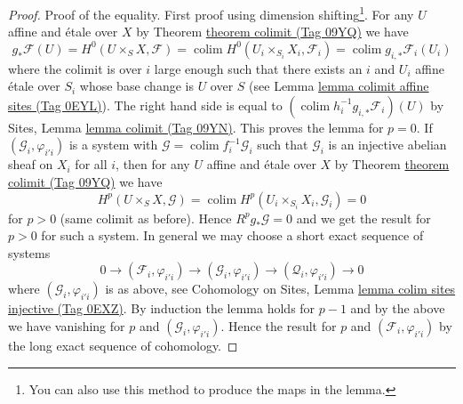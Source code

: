\documentclass{amsart}
\theoremstyle{plain}
\theoremstyle{definition}
\theoremstyle{remark}
\numberwithin{equation}{subsection}
\def\colim{\mathop{\mathrm{colim}}\nolimits}
\begin{document}
\begin{proof}
\medskip\noindent
Proof of the equality. First proof using
dimension shifting\footnote{You can also use this method
to produce the maps in the lemma.}. For any
$U$ affine and \'etale over $X$ by Theorem \href{https://stacks.math.columbia.edu/tag/09YQ}{theorem colimit (Tag 09YQ)}
we have
$$
g_*\mathcal{F}(U) =
H^0(U \times_S X, \mathcal{F}) =
\colim H^0(U_i \times_{S_i} X_i, \mathcal{F}_i) =
\colim g_{i, *}\mathcal{F}_i(U_i)
$$
where the colimit is over $i$ large enough such that
there exists an $i$ and $U_i$ affine \'etale over $S_i$
whose base change is $U$ over $S$ (see
Lemma \href{https://stacks.math.columbia.edu/tag/0EYL}{lemma colimit affine sites (Tag 0EYL)}).
The right hand side is equal to
$(\colim h_i^{-1}g_{i, *}\mathcal{F}_i)(U)$ by
Sites, Lemma \href{https://stacks.math.columbia.edu/tag/09YN}{lemma colimit (Tag 09YN)}.
This proves the lemma for $p = 0$.
If $(\mathcal{G}_i, \varphi_{i'i})$ is a system with
$\mathcal{G} = \colim f_i^{-1}\mathcal{G}_i$
such that $\mathcal{G}_i$ is an injective abelian sheaf on $X_i$
for all $i$, then for any $U$ affine and \'etale over $X$ by
Theorem \href{https://stacks.math.columbia.edu/tag/09YQ}{theorem colimit (Tag 09YQ)} we have
$$
H^p(U \times_S X, \mathcal{G}) =
\colim H^p(U_i \times_{S_i} X_i, \mathcal{G}_i) = 0
$$
for $p > 0$ (same colimit as before). Hence $R^pg_*\mathcal{G} = 0$
and we get the result for $p > 0$ for such a system.
In general we may choose a short exact sequence of systems
$$
0 \to (\mathcal{F}_i, \varphi_{i'i}) \to
(\mathcal{G}_i, \varphi_{i'i}) \to
(\mathcal{Q}_i, \varphi_{i'i}) \to 0
$$
where $(\mathcal{G}_i, \varphi_{i'i})$ is as above, see
Cohomology on Sites, Lemma
\href{https://stacks.math.columbia.edu/tag/0EXZ}{lemma colim sites injective (Tag 0EXZ)}.
By induction the lemma holds for $p - 1$ and by the above we have
vanishing for $p$ and $(\mathcal{G}_i, \varphi_{i'i})$.
Hence the result for $p$
and $(\mathcal{F}_i, \varphi_{i'i})$ by the long exact sequence
of cohomology.


\end{proof}
\end{document}
